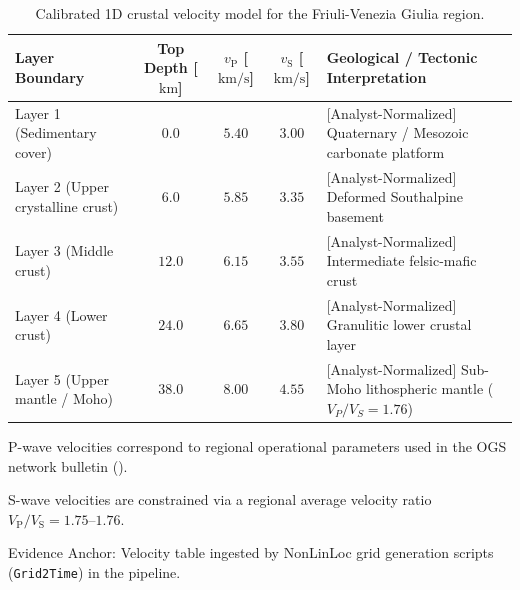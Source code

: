 \begin{table}[htbp]
  \centering
  \small
  \caption{Calibrated 1D crustal velocity model for the Friuli-Venezia Giulia region.}
  \label{tab:velocity_model}
  \begin{threeparttable}
    \begin{tabularx}{\linewidth}{l c c c X}
      \toprule
      \textbf{Layer Boundary} & \textbf{Top Depth} [$\mathrm{km}$] & $v_{\mathrm{P}}$ [$\mathrm{km/s}$]\tnote{a} & $v_{\mathrm{S}}$ [$\mathrm{km/s}$]\tnote{b} & \textbf{Geological / Tectonic Interpretation} \\
      \midrule
      Layer 1 (Sedimentary cover) & $0.0$ & $5.40$ & $3.00$ & [Analyst-Normalized] Quaternary / Mesozoic carbonate platform \\
      Layer 2 (Upper crystalline crust) & $6.0$ & $5.85$ & $3.35$ & [Analyst-Normalized] Deformed Southalpine basement \\
      Layer 3 (Middle crust) & $12.0$ & $6.15$ & $3.55$ & [Analyst-Normalized] Intermediate felsic-mafic crust \\
      Layer 4 (Lower crust) & $24.0$ & $6.65$ & $3.80$ & [Analyst-Normalized] Granulitic lower crustal layer \\
      Layer 5 (Upper mantle / Moho) & $38.0$ & $8.00$ & $4.55$ & [Analyst-Normalized] Sub-Moho lithospheric mantle ($V_P/V_S = 1.76$) \\
      \bottomrule
    \end{tabularx}
    \begin{tablenotes}[flushleft]
      \footnotesize
      \item[a] P-wave velocities correspond to regional operational parameters used in the OGS network bulletin (\cite{SMINO}).
      \item[b] S-wave velocities are constrained via a regional average velocity ratio $V_{\mathrm{P}}/V_{\mathrm{S}} = 1.75$--$1.76$.
      \item Evidence Anchor: Velocity table ingested by NonLinLoc grid generation scripts (\texttt{Grid2Time}) in the pipeline.
    \end{tablenotes}
  \end{threeparttable}
\end{table}

